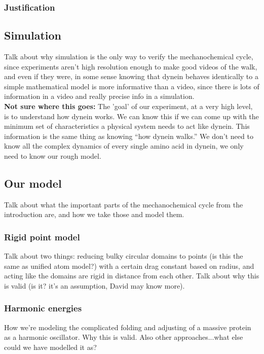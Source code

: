 \documentclass[10pt]{article} %
\begin{document}
                \subsubsection{Justification}

\subsection{Simulation}
Talk about why simulation is the only way to verify the mechanochemical cycle, since experiments
aren't high resolution enough to make good videos of the walk, and even if they were, in some sense
knowing that dynein behaves identically to a simple mathematical model is more informative than
a video, since there is lots of information in a video and really precise info in a simulation.\\

\textbf{Not sure where this goes:} The 'goal' of our experiment, at a very high level, is to
understand how dynein works. We can know this if we can come up with the minimum set of characteristics a physical system needs to act like dynein. This information is the same thing as knowing
``how dynein walks.'' We don't need to know all the complex dynamics of every single amino acid in
dynein, we only need to know our rough model.\\

\subsection{Our model}
Talk about what the important parts of the mechanochemical cycle from the introduction are, and how
we take those and model them.\\
\subsubsection{Rigid point model}
Talk about two things: reducing bulky circular domains to points (is this the same as unified atom
model?) with a certain drag constant based on radius, and acting like the domains are rigid in
distance from each other. Talk about why this is valid (is it? it's an assumption, David may know
more).
\subsubsection{Harmonic energies}
How we're modeling the complicated folding and adjusting of a massive protein as a harmonic
oscillator. Why this is valid. Also other approaches...what else could we have modelled it as?
\end{document}
